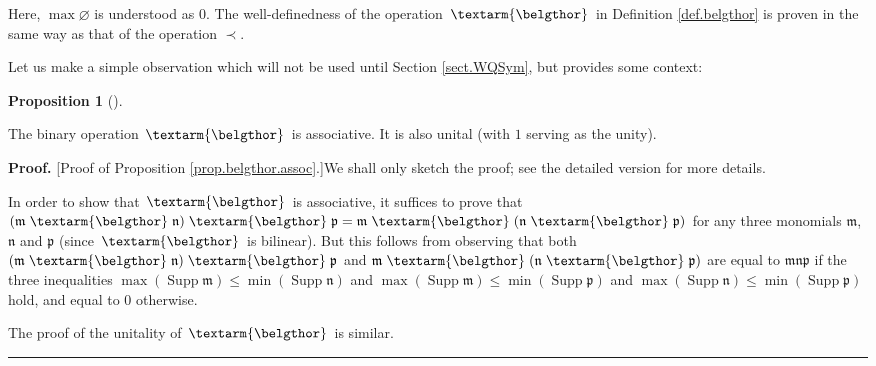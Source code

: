 \documentclass
[numbers=enddot,12pt,final,onecolumn,notitlepage,abstracton]{scrartcl}%
\theoremstyle{definition}
\newtheorem{prop}[theo]{Proposition}
\newenvironment{proposition}[1][]
{\begin{prop}[#1]\begin{leftbar}}
{\end{leftbar}\end{prop}}
\newenvironment{proof}[1][Proof]{\noindent\textbf{#1.} }{\ \rule{0.5em}{0.5em}}
\newenvironment{vershort}{}{}
\newcommand{\bel}{\left. \textarm{\belgthor} \right.}
\begin{document}
Here, $\max\varnothing$ is understood as $0$. The well-definedness of the
operation $\bel $ in Definition \ref{def.belgthor} is proven in the same way
as that of the operation $\left.  \prec\right.  $.

Let us make a simple observation which will not be used until Section
\ref{sect.WQSym}, but provides some context:

\begin{proposition}
\label{prop.belgthor.assoc}The binary operation $\bel $ is associative. It is
also unital (with $1$ serving as the unity).
\end{proposition}

\begin{vershort}
\begin{proof}
[Proof of Proposition \ref{prop.belgthor.assoc}.]We shall only sketch the
proof; see the detailed version for more details.

In order to show that $\bel $ is associative, it suffices to prove that
$\left(  \mathfrak{m} \bel \mathfrak{n}\right)  \bel \mathfrak{p}=\mathfrak{m}
\bel \left(  \mathfrak{n} \bel \mathfrak{p}\right)  $ for any three monomials
$\mathfrak{m}$, $\mathfrak{n}$ and $\mathfrak{p}$ (since $\bel $ is bilinear).
But this follows from observing that both $\left(  \mathfrak{m}
\bel \mathfrak{n}\right)  \bel \mathfrak{p}$ and $\mathfrak{m} \bel \left(
\mathfrak{n} \bel \mathfrak{p}\right)  $ are equal to $\mathfrak{mnp}$ if the
three inequalities $\max\left(  \operatorname*{Supp}\mathfrak{m}\right)
\leq\min\left(  \operatorname*{Supp}\mathfrak{n}\right)  $ and $\max\left(
\operatorname*{Supp}\mathfrak{m}\right)  \leq\min\left(  \operatorname*{Supp}%
\mathfrak{p}\right)  $ and $\max\left(  \operatorname*{Supp}\mathfrak{n}%
\right)  \leq\min\left(  \operatorname*{Supp}\mathfrak{p}\right)  $ hold, and
equal to $0$ otherwise.

The proof of the unitality of $\bel $ is similar.
\end{proof}
\end{vershort}
\end{document}
